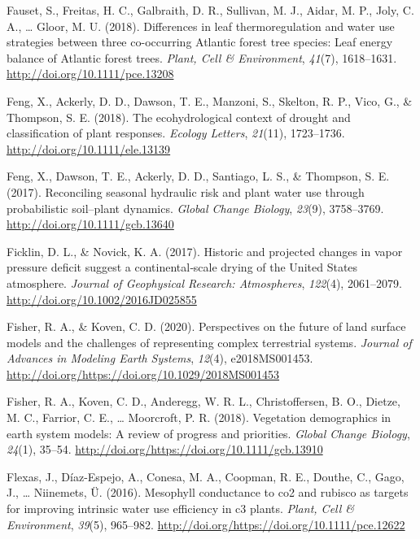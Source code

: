 \documentclass[11pt,twoside]{reedthesis}
\begin{document}
\hypertarget{ref-fauset_differences_2018}{}
Fauset, S., Freitas, H. C., Galbraith, D. R., Sullivan, M. J., Aidar, M.
P., Joly, C. A., \ldots{} Gloor, M. U. (2018). Differences in leaf
thermoregulation and water use strategies between three co-occurring
Atlantic forest tree species: Leaf energy balance of Atlantic forest
trees. \emph{Plant, Cell \& Environment}, \emph{41}(7), 1618--1631.
\url{http://doi.org/10.1111/pce.13208}

\hypertarget{ref-feng_ecohydrological_2018}{}
Feng, X., Ackerly, D. D., Dawson, T. E., Manzoni, S., Skelton, R. P.,
Vico, G., \& Thompson, S. E. (2018). The ecohydrological context of
drought and classification of plant responses. \emph{Ecology Letters},
\emph{21}(11), 1723--1736. \url{http://doi.org/10.1111/ele.13139}

\hypertarget{ref-feng_reconciling_2017}{}
Feng, X., Dawson, T. E., Ackerly, D. D., Santiago, L. S., \& Thompson,
S. E. (2017). Reconciling seasonal hydraulic risk and plant water use
through probabilistic soil--plant dynamics. \emph{Global Change
Biology}, \emph{23}(9), 3758--3769.
\url{http://doi.org/10.1111/gcb.13640}

\hypertarget{ref-ficklin_historic_2017}{}
Ficklin, D. L., \& Novick, K. A. (2017). Historic and projected changes
in vapor pressure deficit suggest a continental‐scale drying of the
United States atmosphere. \emph{Journal of Geophysical Research:
Atmospheres}, \emph{122}(4), 2061--2079.
\url{http://doi.org/10.1002/2016JD025855}

\hypertarget{ref-Fisher2020}{}
Fisher, R. A., \& Koven, C. D. (2020). Perspectives on the future of
land surface models and the challenges of representing complex
terrestrial systems. \emph{Journal of Advances in Modeling Earth
Systems}, \emph{12}(4), e2018MS001453.
\url{http://doi.org/https://doi.org/10.1029/2018MS001453}

\hypertarget{ref-Fisher2018}{}
Fisher, R. A., Koven, C. D., Anderegg, W. R. L., Christoffersen, B. O.,
Dietze, M. C., Farrior, C. E., \ldots{} Moorcroft, P. R. (2018).
Vegetation demographics in earth system models: A review of progress and
priorities. \emph{Global Change Biology}, \emph{24}(1), 35--54.
\url{http://doi.org/https://doi.org/10.1111/gcb.13910}

\hypertarget{ref-Flexas2015}{}
Flexas, J., Díaz-Espejo, A., Conesa, M. A., Coopman, R. E., Douthe, C.,
Gago, J., \ldots{} Niinemets, Ü. (2016). Mesophyll conductance to co2
and rubisco as targets for improving intrinsic water use efficiency in
c3 plants. \emph{Plant, Cell \& Environment}, \emph{39}(5), 965--982.
\url{http://doi.org/https://doi.org/10.1111/pce.12622}
\end{document}
